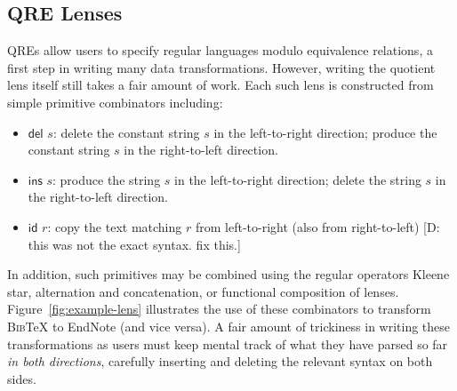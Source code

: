 \documentclass[acmsmall,review,anonymous]{acmart}\settopmatter{printfolios=true,printccs=false,printacmref=false}
\newcommand{\FINISH}[3]{\ifdraft\textcolor{#1}{[#2: #3]}\fi}
\newcommand{\dpw}[1]{\FINISH{dkblue}{D}{#1}} %
\newcommand{\kw}[1]{\ensuremath{\mathsf{#1}}}
\newcommand{\bibtex}{\textsc{Bib}\TeX{}}
\newcommand{\cd}[1]{\lstinline[backgroundcolor=\color{white}]$#1$}
\begin{document}



\subsection{QRE Lenses}
QREs allow users to specify regular languages modulo equivalence relations,
a first step in writing many data transformations.  However, writing the
quotient lens itself still takes a fair amount of work.  Each such lens
is constructed from simple primitive combinators including:
%
\begin{itemize}
\item \kw{del} $s$: delete the constant string $s$ in the left-to-right direction; produce the constant string $s$ in the right-to-left direction.
\item \kw{ins} $s$: produce the string $s$ in the left-to-right direction;
delete the string $s$ in the right-to-left direction.
\item \kw{id} $r$: copy the text matching $r$ from left-to-right (also from
right-to-left) \dpw{this was not the exact syntax.  fix this.}
\end{itemize}
%
In addition, such primitives may be combined using the regular operators
Kleene star, alternation and concatenation, or functional composition of
lenses.  Figure~\ref{fig:example-lens} illustrates the use of these
combinators to transform \bibtex{} to EndNote (and vice versa).
A fair amount of trickiness in writing these transformations as users
must keep mental track of what they have parsed so far \emph{in both
directions}, carefully inserting and deleting the relevant syntax on both
sides.
\end{document}
